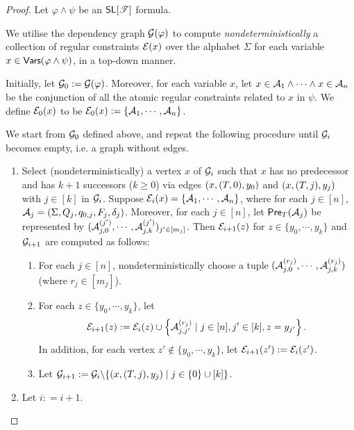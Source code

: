 \begin{proof}
Let $\varphi \wedge \psi$ be an $\textsf{SL}[\mathscr{T}]$ formula. 

We utilise the dependency graph $\mathcal{G}(\varphi)$ to compute \emph{nondeterministically} a collection of regular constraints $\mathcal{E}(x)$ over the alphabet $\Sigma$ for each variable $x \in \mathsf{Vars}(\varphi \wedge \psi)$, in a top-down manner.


Initially, let $\mathcal{G}_0:= \mathcal{G}(\varphi)$. Moreover, for each variable $x$, let $x \in \mathcal{A}_1 \wedge \cdots \wedge x \in \mathcal{A}_n$ be the conjunction of all the atomic regular constraints related to $x$ in $\psi$. 
 We define $\mathcal{E}_0(x)$  to be $\mathcal{E}_0(x):=  \left\{\mathcal{A}_1,\cdots, \mathcal{A}_n \right\}$.

We start from $\mathcal{G}_0$  defined above, and repeat the following procedure until %
$\mathcal{G}_i$ becomes empty, i.e. a graph without edges.
 
\begin{enumerate}
\item Select (nondeterministically) a vertex $x$ of $\mathcal{G}_i$ such that $x$ has no predecessor and has $k+1$ successors ($k\geq 0$) via edges $(x, (T, 0), y_0)$ and $(x, (T, j), y_j)$ with $j \in [k]$ in $\mathcal{G}_i$.  Suppose $\mathcal{E}_i(x)=\{\mathcal{A}_1, \cdots, \mathcal{A}_n\}$, where for each $j \in [n]$, $\mathcal{A}_j = (\Sigma, Q_j, q_{0,j}, F_j, \delta_j)$. Moreover, for each $j \in [n]$, let $\textsf{Pre}_{T}(\mathcal{A}_j)$ be represented by $(\mathcal{A}^{(j')}_{j, 0}, \cdots, \mathcal{A}^{(j')}_{j, k})_{ j'  \in [m_j]}$.
Then $\mathcal{E}_{i+1}(z)$ for $z \in  \{y_0,\cdots, y_k\}$ and $\mathcal{G}_{i+1}$ are computed as follows:
\begin{enumerate}
\item For each $j \in [n]$, nondeterministically choose a tuple $(\mathcal{A}^{(r_j)}_{j, 0}, \cdots, \mathcal{A}^{(r_j)}_{j, k})$ (where $r_j \in [m_j]$).
%
\item For each $z \in \{y_0,\cdots, y_k\}$, let
\[
    \mathcal{E}_{i+1}(z):= \mathcal{E}_{i}(z) \cup \left\{\mathcal{A}^{(r_j)}_{j, j'} \mid  j \in [n], j' \in [k], z = y_{j'} \right\}.
\]
In addition, for each vertex $z'  {\notin} \{y_0,\cdots, y_k\}$, let $\mathcal{E}_{i+1}(z') := \mathcal{E}_i(z')$.
%
\item Let $\mathcal{G}_{i+1}:= \mathcal{G}_i \backslash \{(x, (T, j), y_j) \mid j \in \{0\} \cup [k]\}$.
\end{enumerate}
%
\item Let $i: = i+1$.
\end{enumerate}


\end{proof}
